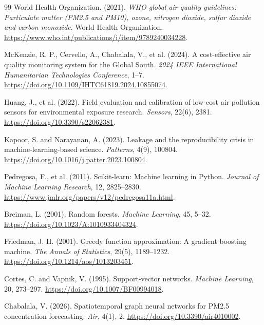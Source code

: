 \documentclass[12pt,a4paper,oneside]{report}
\begin{document}
\begin{thebibliography}{99}
World Health Organization. (2021).
\emph{WHO global air quality guidelines: Particulate matter (PM2.5 and PM10), ozone, nitrogen dioxide, sulfur dioxide and carbon monoxide}.
World Health Organization. \url{https://www.who.int/publications/i/item/9789240034228}.

McKenzie, R. P., Cervello, A., Chabalala, V., et al. (2024).
A cost-effective air quality monitoring system for the Global South.
\emph{2024 IEEE International Humanitarian Technologies Conference}, 1--7.
\url{https://doi.org/10.1109/IHTC61819.2024.10855074}.

Huang, J., et al. (2022).
Field evaluation and calibration of low-cost air pollution sensors for environmental exposure research.
\emph{Sensors}, 22(6), 2381.
\url{https://doi.org/10.3390/s22062381}.

Kapoor, S. and Narayanan, A. (2023).
Leakage and the reproducibility crisis in machine-learning-based science.
\emph{Patterns}, 4(9), 100804.
\url{https://doi.org/10.1016/j.patter.2023.100804}.

Pedregosa, F., et al. (2011).
Scikit-learn: Machine learning in Python.
\emph{Journal of Machine Learning Research}, 12, 2825--2830.
\url{https://www.jmlr.org/papers/v12/pedregosa11a.html}.

Breiman, L. (2001). Random forests.
\emph{Machine Learning}, 45, 5--32.
\url{https://doi.org/10.1023/A:1010933404324}.

Friedman, J. H. (2001). Greedy function approximation: A gradient boosting machine.
\emph{The Annals of Statistics}, 29(5), 1189--1232.
\url{https://doi.org/10.1214/aos/1013203451}.

Cortes, C. and Vapnik, V. (1995). Support-vector networks.
\emph{Machine Learning}, 20, 273--297.
\url{https://doi.org/10.1007/BF00994018}.

Chabalala, V. (2026). Spatiotemporal graph neural networks for PM2.5 concentration forecasting.
\emph{Air}, 4(1), 2.
\url{https://doi.org/10.3390/air4010002}.
\end{thebibliography}
\end{document}
